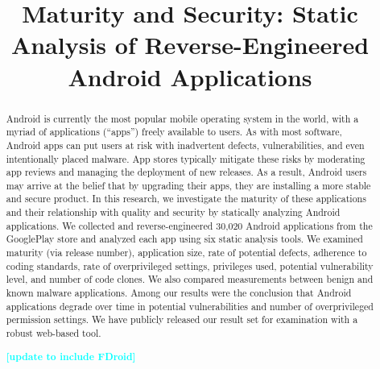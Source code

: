 \documentclass[conference]{IEEEtran}
\newcommand{\todo}[1]{\textcolor{cyan}{\textbf{[#1]}}}
\begin{document}
%
\title{Maturity and Security: Static Analysis of Reverse-Engineered Android Applications}

\author{
}








\maketitle


\begin{abstract}

Android is currently the most popular mobile operating system in the world, with a myriad of applications (``apps'') freely available to users. As with most software, Android apps can put users at risk with inadvertent defects, vulnerabilities, and even intentionally placed malware. App stores typically mitigate these risks by moderating app reviews and managing the deployment of new releases. As a result, Android users may arrive at the belief that by upgrading their apps, they are installing a more stable and secure product. In this research, we investigate the maturity of these applications and their relationship with quality and security by statically analyzing Android applications. We collected and reverse-engineered 30,020 Android applications from the GooglePlay store and analyzed each app using six static analysis tools. We examined maturity (via release number), application size, rate of potential defects, adherence to coding standards, rate of overprivileged settings, privileges used, potential vulnerability level, and number of code clones. We also compared measurements between benign and known malware applications. Among our results were the conclusion that Android applications degrade over time in potential vulnerabilities and number of overprivileged permission settings. We have publicly released our result set for examination with a robust web-based tool.

\todo{update to include FDroid}

\end{abstract}
\end{document}

